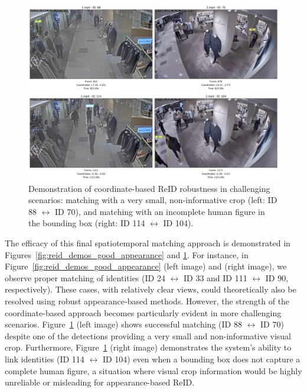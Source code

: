 \documentclass[12pt, a4paper]{article}
\begin{document}
\begin{figure}[H]
    \centering
    \begin{minipage}{0.48\linewidth}
        \centering
        \includegraphics[width=\linewidth]{pictures/demo_reid2.jpeg} %
    \end{minipage}
    \hfill %
    \begin{minipage}{0.48\linewidth}
        \centering
        \includegraphics[width=\linewidth]{pictures/demo_reid4.jpeg} %
    \end{minipage}
    \caption{Demonstration of coordinate-based ReID robustness in challenging scenarios: matching with a very small, non-informative crop (left: ID 88 $\leftrightarrow$ ID 70), and matching with an incomplete human figure in the bounding box (right: ID 114 $\leftrightarrow$ ID 104).}
    \label{fig:reid_demos_challenging_appearance}
\end{figure}



The efficacy of this final spatiotemporal matching approach is demonstrated in Figures~\ref{fig:reid_demos_good_appearance} and \ref{fig:reid_demos_challenging_appearance}. For instance, in Figure~\ref{fig:reid_demos_good_appearance} (left image) and (right image), we observe proper matching of identities (ID 24 $\leftrightarrow$ ID 33 and ID 111 $\leftrightarrow$ ID 90, respectively). These cases, with relatively clear views, could theoretically also be resolved using robust appearance-based methods. However, the strength of the coordinate-based approach becomes particularly evident in more challenging scenarios. Figure~\ref{fig:reid_demos_challenging_appearance} (left image) shows successful matching (ID 88 $\leftrightarrow$ ID 70) despite one of the detections providing a very small and non-informative visual crop. Furthermore, Figure~\ref{fig:reid_demos_challenging_appearance} (right image) demonstrates the system's ability to link identities (ID 114 $\leftrightarrow$ ID 104) even when a bounding box does not capture a complete human figure, a situation where visual crop information would be highly unreliable or misleading for appearance-based ReID.
\end{document}
